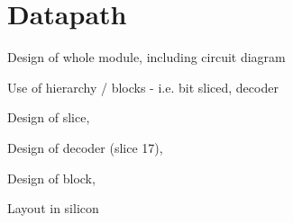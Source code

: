 

\section{Datapath}


Design of whole module, including circuit diagram

Use of hierarchy / blocks - i.e. bit sliced, decoder

Design of slice,

Design of decoder (slice 17),

Design of block,

Layout in silicon

